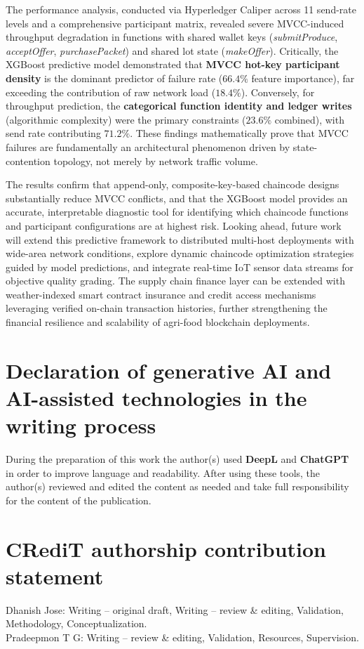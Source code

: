 \documentclass[12pt]{article}
\begin{document}
	The performance analysis, conducted via Hyperledger Caliper across 11 send-rate levels and a comprehensive participant matrix, revealed severe MVCC-induced throughput degradation in functions with shared wallet keys (\textit{submitProduce}, \textit{acceptOffer}, \textit{purchasePacket}) and shared lot state (\textit{makeOffer}). Critically, the XGBoost predictive model demonstrated that \textbf{MVCC hot-key participant density} is the dominant predictor of failure rate ($66.4\%$ feature importance), far exceeding the contribution of raw network load ($18.4\%$). Conversely, for throughput prediction, the \textbf{categorical function identity and ledger writes} (algorithmic complexity) were the primary constraints ($23.6\%$ combined), with send rate contributing $71.2\%$. These findings mathematically prove that MVCC failures are fundamentally an architectural phenomenon driven by state-contention topology, not merely by network traffic volume.
	
	The results confirm that append-only, composite-key-based chaincode designs substantially reduce MVCC conflicts, and that the XGBoost model provides an accurate, interpretable diagnostic tool for identifying which chaincode functions and participant configurations are at highest risk. Looking ahead, future work will extend this predictive framework to distributed multi-host deployments with wide-area network conditions, explore dynamic chaincode optimization strategies guided by model predictions, and integrate real-time IoT sensor data streams for objective quality grading. The supply chain finance layer can be extended with weather-indexed smart contract insurance and credit access mechanisms leveraging verified on-chain transaction histories, further strengthening the financial resilience and scalability of agri-food blockchain deployments.
	
	\section*{Declaration of generative AI and AI-assisted technologies in the writing process}
	During the preparation of this work the author(s) used \textbf{DeepL} and \textbf{ChatGPT} in order to improve language and readability. 
	After using these tools, the author(s) reviewed and edited the content as needed and take full responsibility for the content of the publication.
	
	\section*{CRediT authorship contribution statement}
	Dhanish Jose: Writing – original draft, Writing – review \& editing, Validation, Methodology, Conceptualization.\\
	Pradeepmon T G: Writing – review \& editing, Validation, Resources, Supervision.
	
\end{document}
